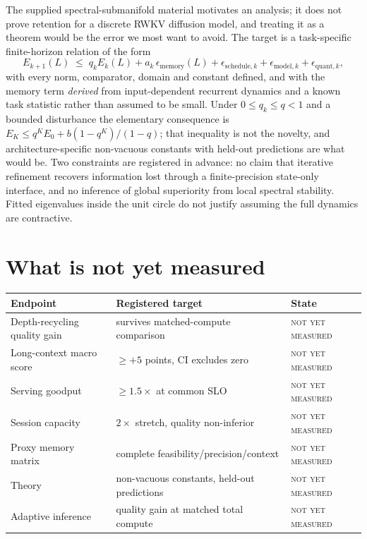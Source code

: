 \documentclass[11pt]{article}
\newcommand{\notrun}{\textsc{not yet measured}}
\begin{document}
The supplied spectral-submanifold material motivates an analysis; it does not prove
retention for a discrete RWKV diffusion model, and treating it as a theorem would be the
error we most want to avoid. The target is a task-specific finite-horizon relation of
the form
\[
E_{k+1}(L) \;\le\; q_k E_k(L) + a_k\,\epsilon_{\mathrm{memory}}(L)
            + \epsilon_{\mathrm{schedule},k} + \epsilon_{\mathrm{model},k}
            + \epsilon_{\mathrm{quant},k},
\]
with every norm, comparator, domain and constant defined, and with the memory term
\emph{derived} from input-dependent recurrent dynamics and a known task statistic rather
than assumed to be small. Under $0\le q_k\le q<1$ and a bounded disturbance the
elementary consequence is $E_K \le q^K E_0 + b(1-q^K)/(1-q)$; that inequality is not the
novelty, and architecture-specific non-vacuous constants with held-out predictions are
what would be. Two constraints are registered in advance: no claim that iterative
refinement recovers information lost through a finite-precision state-only interface,
and no inference of global superiority from local spectral stability. Fitted eigenvalues
inside the unit circle do not justify assuming the full dynamics are contractive.

\section{What is not yet measured}
\label{sec:not-measured}
\label{sec:notrun}

\begin{center}
\begin{tabular}{@{}lll@{}}
\toprule
Endpoint & Registered target & State \\
\midrule
Depth-recycling quality gain & survives matched-compute comparison & \notrun \\
Long-context macro score & $\ge +5$ points, CI excludes zero & \notrun \\
Serving goodput & $\ge 1.5\times$ at common SLO & \notrun \\
Session capacity & $2\times$ stretch, quality non-inferior & \notrun \\
Proxy memory matrix & complete feasibility/precision/context & \notrun \\
Theory & non-vacuous constants, held-out predictions & \notrun \\
Adaptive inference & quality gain at matched total compute & \notrun \\
\bottomrule
\end{tabular}
\end{center}
\end{document}
